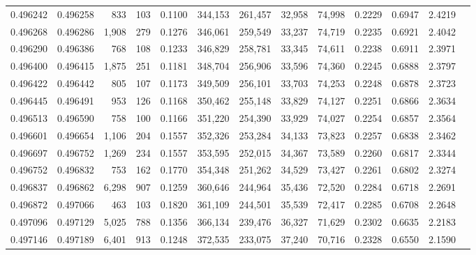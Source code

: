 \begin{tabular}{rrrrrrrrrrrrr}
0.496242 & 0.496258 &   833 &   103 &                                     0.1100 & 344,153 & 261,457 &  32,958 &  74,998 & 0.2229 & 0.6947 & 2.4219 \\
0.496268 & 0.496286 & 1,908 &   279 &                                     0.1276 & 346,061 & 259,549 &  33,237 &  74,719 & 0.2235 & 0.6921 & 2.4042 \\
0.496290 & 0.496386 &   768 &   108 &                                     0.1233 & 346,829 & 258,781 &  33,345 &  74,611 & 0.2238 & 0.6911 & 2.3971 \\
0.496400 & 0.496415 & 1,875 &   251 &                                     0.1181 & 348,704 & 256,906 &  33,596 &  74,360 & 0.2245 & 0.6888 & 2.3797 \\
0.496422 & 0.496442 &   805 &   107 &                                     0.1173 & 349,509 & 256,101 &  33,703 &  74,253 & 0.2248 & 0.6878 & 2.3723 \\
0.496445 & 0.496491 &   953 &   126 &                                     0.1168 & 350,462 & 255,148 &  33,829 &  74,127 & 0.2251 & 0.6866 & 2.3634 \\
0.496513 & 0.496590 &   758 &   100 &                                     0.1166 & 351,220 & 254,390 &  33,929 &  74,027 & 0.2254 & 0.6857 & 2.3564 \\
0.496601 & 0.496654 & 1,106 &   204 &                                     0.1557 & 352,326 & 253,284 &  34,133 &  73,823 & 0.2257 & 0.6838 & 2.3462 \\
0.496697 & 0.496752 & 1,269 &   234 &                                     0.1557 & 353,595 & 252,015 &  34,367 &  73,589 & 0.2260 & 0.6817 & 2.3344 \\
0.496752 & 0.496832 &   753 &   162 &                                     0.1770 & 354,348 & 251,262 &  34,529 &  73,427 & 0.2261 & 0.6802 & 2.3274 \\
0.496837 & 0.496862 & 6,298 &   907 &                                     0.1259 & 360,646 & 244,964 &  35,436 &  72,520 & 0.2284 & 0.6718 & 2.2691 \\
0.496872 & 0.497066 &   463 &   103 &                                     0.1820 & 361,109 & 244,501 &  35,539 &  72,417 & 0.2285 & 0.6708 & 2.2648 \\
0.497096 & 0.497129 & 5,025 &   788 &                                     0.1356 & 366,134 & 239,476 &  36,327 &  71,629 & 0.2302 & 0.6635 & 2.2183 \\
0.497146 & 0.497189 & 6,401 &   913 &                                     0.1248 & 372,535 & 233,075 &  37,240 &  70,716 & 0.2328 & 0.6550 & 2.1590 \\

\end{tabular}
